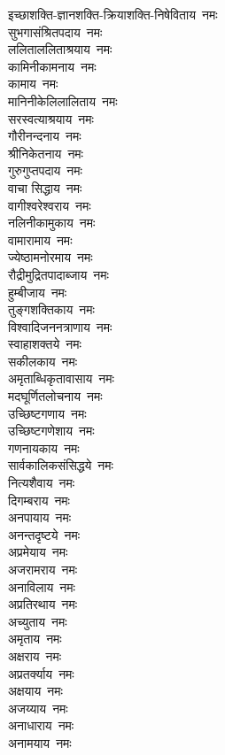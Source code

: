 \begin{multicols}{2}
\begin{flushleft}
इच्छाशक्ति-ज्ञानशक्ति-क्रियाशक्ति-निषेविताय~नमः\\
सुभगासंश्रितपदाय~नमः\\
ललिताललिताश्रयाय~नमः\\
कामिनीकामनाय~नमः\hfill{}\\
कामाय~नमः\\
मानिनीकेलिलालिताय~नमः\\
सरस्वत्याश्रयाय~नमः\\
गौरीनन्दनाय~नमः\\
श्रीनिकेतनाय~नमः\\
गुरुगुप्तपदाय~नमः\\
वाचा सिद्धाय~नमः\\
वागीश्वरेश्वराय~नमः\\
नलिनीकामुकाय~नमः\\
वामारामाय~नमः\hfill{}\\
ज्येष्ठामनोरमाय~नमः\\
रौद्रीमुद्रितपादाब्जाय~नमः\\
हुम्बीजाय~नमः\\
तुङ्गशक्तिकाय~नमः\\
विश्वादिजननत्राणाय~नमः\\
स्वाहाशक्तये~नमः\\
सकीलकाय~नमः\\
अमृताब्धिकृतावासाय~नमः\\
मदघूर्णितलोचनाय~नमः\\
उच्छिष्टगणाय~नमः\hfill{}\\
उच्छिष्टगणेशाय~नमः\\
गणनायकाय~नमः\\
सार्वकालिकसंसिद्धये~नमः\\
नित्यशैवाय~नमः\\
दिगम्बराय~नमः\\
अनपायाय~नमः\\
अनन्तदृष्टये~नमः\\
अप्रमेयाय~नमः\\
अजरामराय~नमः\\
अनाविलाय~नमः\hfill{}\\
अप्रतिरथाय~नमः\\
अच्युताय~नमः\\
अमृताय~नमः\\
अक्षराय~नमः\\
अप्रतर्क्याय~नमः\\
अक्षयाय~नमः\\
अजय्याय~नमः\\
अनाधाराय~नमः\\
अनामयाय~नमः\\

\end{flushleft}
\end{multicols}
